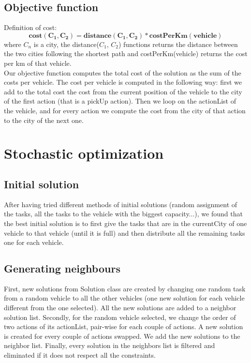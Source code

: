 \documentclass[11pt]{article}
\begin{document}
\subsection{Objective function}
Definition of cost:
\begin{equation*}
    \mathbf{cost(C_1, C_2)} = \mathbf{distance(C_1, C_2) * costPerKm(vehicle)}
\end{equation*}
where $C_n$ is a city, the distance($C_1$, $C_2$) functions returns the distance between the two cities following the shortest path and costPerKm(vehicle) returns the cost per km of that vehicle.
\\
Our objective function computes the total cost of the solution as the sum of the costs per vehicle. The cost per vehicle is computed in the following way: first we add to the total cost the cost from the current position of the vehicle to the city of the first action (that is a pickUp action). Then we loop on the actionList of the vehicle, and for every action we compute the cost from the city of that action to the city of the next one.

\section{Stochastic optimization}

\subsection{Initial solution}
After having tried different methods of initial solutions (random assignment of the tasks, all the tasks to the vehicle with the biggest capacity...), we found that the best initial solution is to first give the tasks that are in the currentCity of one vehicle to that vehicle (until it is full) and then distribute all the remaining tasks one for each vehicle.

\subsection{Generating neighbours}
First, new solutions from Solution class are created by changing one random task from a random vehicle to all the other vehicles (one new solution for each vehicle different from the one selected). All the new solutions are added to a neighbor solution list. Secondly, for the random vehicle selected, we change the order of two actions of its actionList, pair-wise for each couple of actions. A new solution is created for every couple of actions swapped. We add the new solutions to the neighbor list. Finally, every solution in the neighbors list is filtered and eliminated if it does not respect all the constraints.
\end{document}
